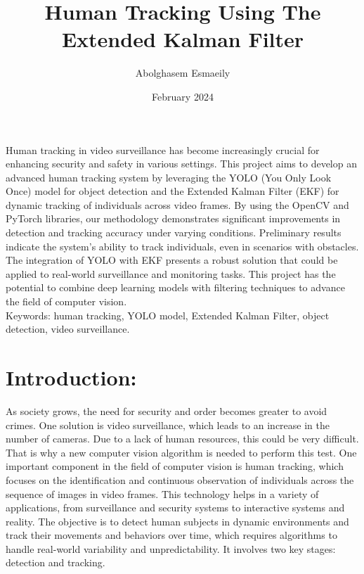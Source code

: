 \documentclass{article}
\title{Human Tracking Using The Extended Kalman Filter}
\author{Abolghasem Esmaeily}
\date{February 2024}
\begin{document}
\maketitle


\begin{abstract}

\end{abstract}
Human tracking in video surveillance has become increasingly crucial for enhancing security and safety in various settings. This project aims to develop an advanced human tracking system by leveraging the YOLO (You Only Look Once) model for object detection and the Extended Kalman Filter (EKF) for dynamic tracking of individuals across video frames. By using the OpenCV and PyTorch libraries, our methodology demonstrates significant improvements in detection and tracking accuracy under varying conditions. Preliminary results indicate the system's ability to track individuals, even in scenarios with obstacles. The integration of YOLO with EKF presents a robust solution that could be applied to real-world surveillance and monitoring tasks. This project has the potential to combine deep learning models with filtering techniques to advance the field of computer vision.\\

Keywords: human tracking, YOLO model, Extended Kalman Filter, object detection, video surveillance.

\newpage
\section{Introduction:}

As society grows, the need for security and order becomes greater to avoid crimes. One solution is video surveillance, which leads to an increase in the number of cameras. Due to a lack of human resources, this could be very difficult. That is why a new computer vision algorithm is needed to perform this test. One important component in the field of computer vision is human tracking, which focuses on the identification and continuous observation of individuals across the sequence of images in video frames. This technology helps in a variety of applications, from surveillance and security systems to interactive systems and reality. The objective is to detect human subjects in dynamic environments and track their movements and behaviors over time, which requires algorithms to handle real-world variability and unpredictability. It involves two key stages: detection and tracking. 
\end{document}
